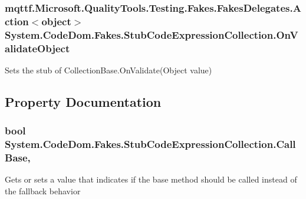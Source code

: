 \hypertarget{class_system_1_1_code_dom_1_1_fakes_1_1_stub_code_expression_collection_a3ee407c94c51c163881e2fa974b680dc}{
\subsubsection[{On\-Validate\-Object}]{\setlength{\rightskip}{0pt plus 5cm}mqttf.\-Microsoft.\-Quality\-Tools.\-Testing.\-Fakes.\-Fakes\-Delegates.\-Action$<$object$>$ System.\-Code\-Dom.\-Fakes.\-Stub\-Code\-Expression\-Collection.\-On\-Validate\-Object}}\label{class_system_1_1_code_dom_1_1_fakes_1_1_stub_code_expression_collection_a3ee407c94c51c163881e2fa974b680dc}


Sets the stub of Collection\-Base.\-On\-Validate(\-Object value)



\subsection{Property Documentation}
\hypertarget{class_system_1_1_code_dom_1_1_fakes_1_1_stub_code_expression_collection_a959a5df2d047bd667ffb476a0ecc0e5f}{
\subsubsection[{Call\-Base}]{\setlength{\rightskip}{0pt plus 5cm}bool System.\-Code\-Dom.\-Fakes.\-Stub\-Code\-Expression\-Collection.\-Call\-Base\hspace{0.3cm}{\ttfamily [get]}, {\ttfamily [set]}}}\label{class_system_1_1_code_dom_1_1_fakes_1_1_stub_code_expression_collection_a959a5df2d047bd667ffb476a0ecc0e5f}


Gets or sets a value that indicates if the base method should be called instead of the fallback behavior

